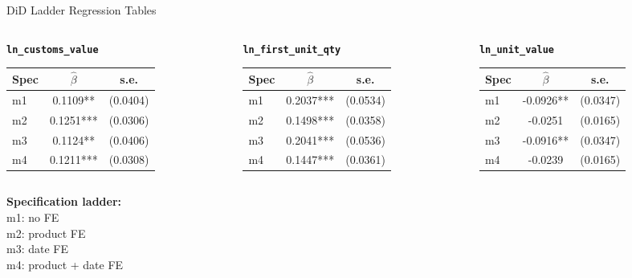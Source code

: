 \documentclass[aspectratio=169]{beamer}
\begin{document}
\begin{frame}{DiD Ladder Regression Tables}
  \fontsize{10}{12}\selectfont
  \centering
  \begin{columns}[T,onlytextwidth]
    \begin{column}{0.33\textwidth}
      \centering \textbf{\texttt{ln\_customs\_value}}\\[0.2em]
      \begin{tabular}{lcc}
        \toprule
        Spec & $\hat\beta$ & s.e.     \\
        \midrule
        m1   & 0.1109**    & (0.0404) \\
        m2   & 0.1251***   & (0.0306) \\
        m3   & 0.1124**    & (0.0406) \\
        m4   & 0.1211***   & (0.0308) \\
        \bottomrule
      \end{tabular}
    \end{column}
    \begin{column}{0.33\textwidth}
      \centering \textbf{\texttt{ln\_first\_unit\_qty}}\\[0.2em]
      \begin{tabular}{lcc}
        \toprule
        Spec & $\hat\beta$ & s.e.     \\
        \midrule
        m1   & 0.2037***   & (0.0534) \\
        m2   & 0.1498***   & (0.0358) \\
        m3   & 0.2041***   & (0.0536) \\
        m4   & 0.1447***   & (0.0361) \\
        \bottomrule
      \end{tabular}
    \end{column}
    \begin{column}{0.33\textwidth}
      \centering \textbf{\texttt{ln\_unit\_value}}\\[0.2em]
      \begin{tabular}{lcc}
        \toprule
        Spec & $\hat\beta$ & s.e.     \\
        \midrule
        m1   & -0.0926**   & (0.0347) \\
        m2   & -0.0251     & (0.0165) \\
        m3   & -0.0916**   & (0.0347) \\
        m4   & -0.0239     & (0.0165) \\
        \bottomrule
      \end{tabular}
    \end{column}
  \end{columns}

  \vspace{1em}
  \scriptsize
  \textbf{Specification ladder:}\\
  m1: no FE\\
  m2: product FE\\
  m3: date FE\\
  m4: product + date FE\\
\end{frame}
\end{document}
